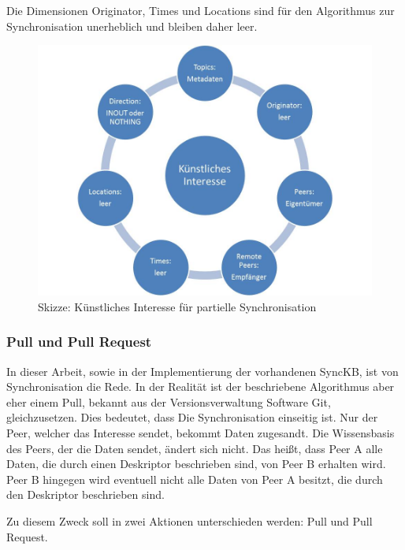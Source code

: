 \documentclass[a4paper]{article}
\begin{document}
	Die Dimensionen Originator, Times und Locations sind für den
	Algorithmus zur	Synchronisation unerheblich und bleiben daher leer.
	
	\begin{figure}[H]
		\includegraphics[width=\linewidth]{../Bilder/artificial_context.jpg}
		\caption{Skizze: Künstliches Interesse für partielle Synchronisation}
		\label{fig:artificial_context}
	\end{figure}
	
	\subsubsection{Pull und Pull Request}
	\label{sec:pull}
	
	In dieser Arbeit, sowie in der Implementierung der vorhandenen SyncKB, ist
	von Synchronisation die Rede. In der Realität ist der beschriebene 
	Algorithmus aber eher einem Pull, bekannt aus der Versionsverwaltung
	Software Git, gleichzusetzen. Dies bedeutet, dass Die Synchronisation
	einseitig ist. Nur der Peer, welcher das Interesse sendet, bekommt Daten
	zugesandt. Die Wissensbasis des Peers, der die Daten sendet, ändert sich nicht.
	Das heißt, dass Peer A alle Daten, die durch einen Deskriptor beschrieben sind,
	von Peer B erhalten wird. Peer B hingegen wird eventuell nicht alle Daten von
	Peer A besitzt, die durch den Deskriptor beschrieben sind.
	
	\newpage
	Zu diesem Zweck soll in zwei Aktionen unterschieden werden: 
	Pull und Pull Request.
	
\end{document}
